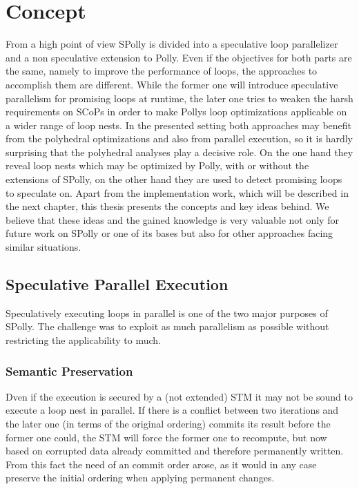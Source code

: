 
\chapter{Concept} %
\label{Chapter3}

From a high point of view SPolly is divided into a speculative loop parallelizer 
and a non speculative extension to Polly. Even if the objectives for both parts 
are the same, namely to improve the performance of loops, the approaches to accomplish 
them are different. While the former one will introduce speculative parallelism
for promising loops at runtime, the later one tries to weaken the harsh 
requirements on SCoPs in order to make Pollys loop optimizations applicable on
a wider range of loop nests. In the presented setting both approaches may benefit
from the polyhedral optimizations and also from parallel execution, so it is 
hardly surprising that the polyhedral analyses play a decisive role. 
On the one hand they reveal loop nests which may be optimized by Polly, with or
without the extensions of SPolly, on the other hand they are used to detect 
promising loops to speculate on.
Apart from the implementation work, which will be described in the 
next chapter, this thesis presents the concepts and key ideas behind.
We believe that these ideas and the gained knowledge is very 
valuable not only for future work on SPolly or one of its bases but also for
other approaches facing similar situations.



\section{Speculative Parallel Execution}
\label{SpeculativeParallelExecution}
Speculatively executing loops in parallel is one of the two major purposes of 
SPolly. The challenge was to exploit as much parallelism as possible 
without restricting the applicability to much. 

\subsection{Semantic Preservation}
Dven if the execution is secured by a (not extended) STM it may not 
be sound to execute a loop nest in parallel. 
If there is a conflict between two iterations and the
later one (in terms of the original ordering) commits its result before the 
former one could, the STM will force the former one to recompute, 
but now based on corrupted data already committed and therefore permanently written.
From this fact the need of an commit order arose, as it would in any case preserve
the initial ordering when applying permanent changes.

